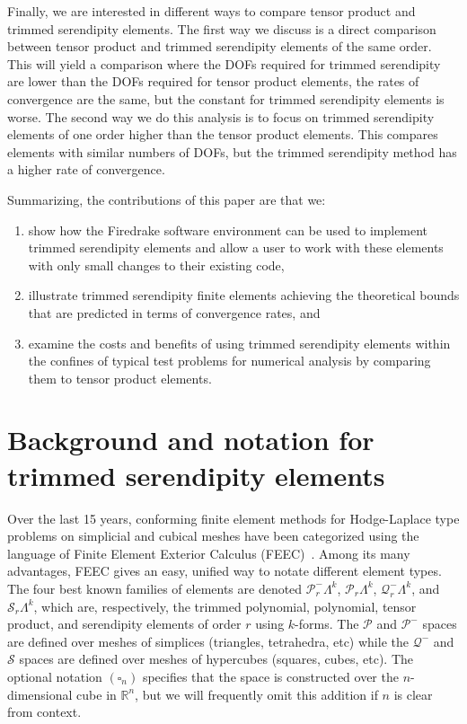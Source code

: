\documentclass[format=acmsmall,screen,timestamp=false,a4paper]{acmart}
\newcommand{\R}{\mathbb{R}}
\newcommand{\calP}{\mathcal{P}}
\newcommand{\calQ}{\mathcal{Q}}
\newcommand{\calS}{\mathcal{S}}
\begin{document}
  Finally, we are interested in different ways to compare tensor product and trimmed serendipity elements.  The first way we discuss is a direct comparison between tensor product and trimmed serendipity elements of the same order.  This will yield a comparison where the DOFs required for trimmed serendipity are lower than the DOFs required for tensor product elements, the rates of convergence are the same, but the constant for trimmed serendipity elements is worse.  The second way we do this analysis is to focus on trimmed serendipity elements of one order higher than the tensor product elements.  This compares elements with similar numbers of DOFs, but the trimmed serendipity method has a higher rate of convergence.

   
   
Summarizing, the contributions of this paper are that we:
\begin{enumerate}
\item show how the Firedrake software environment can be used to implement trimmed serendipity elements and allow a user to work with these elements with only small changes to their existing code, 
\item illustrate trimmed serendipity finite elements achieving the theoretical bounds that are predicted in terms of convergence rates, and  
\item examine the costs and benefits of using trimmed serendipity elements within the confines of typical test problems for numerical analysis by comparing them to tensor product elements.
\end{enumerate}
  
  
\section{Background and notation for trimmed serendipity elements}
   
    Over the last 15 years, conforming finite element methods for Hodge-Laplace type problems on simplicial and cubical meshes have been categorized using the language of Finite Element Exterior Calculus (FEEC)~\cite{AFW2006,AFW2010,ABB2012}.  Among its many advantages, FEEC gives an easy, unified way to notate different element types.  The four best known families of elements are denoted $\calP^-_r \Lambda^k$, $\calP_r \Lambda^k$, $\calQ^-_r \Lambda^k$, and $\calS_r \Lambda^k$, which are, respectively, the trimmed polynomial, polynomial, tensor product, and serendipity elements of order $r$ using $k$-forms.  The $\calP$ and $\calP^-$ spaces are defined over meshes of simplices (triangles, tetrahedra, etc) while the $\calQ^-$ and $\calS$ spaces are defined over meshes of hypercubes (squares, cubes, etc). The optional notation $(\square_n)$ specifies that the space is constructed over the $n$-dimensional cube in $\R^n$, but we will frequently omit this addition if $n$ is clear from context.
    
\end{document}
